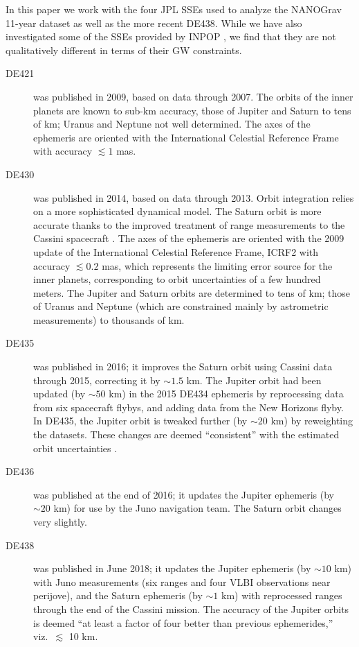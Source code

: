 \documentclass[iop,apj,twocolappendix]{emulateapj}
\begin{document}
In this paper we work with the four JPL SSEs used to analyze the NANOGrav 11-year dataset \citep{2018ApJ...859...47A} as well as the more recent DE438. While we have also investigated some of the SSEs provided by INPOP \citep{inpop13,inpop17}, we find that they are not qualitatively different in terms of their GW constraints.
%
\begin{description}
%
\item[DE421 \citep{2009IPNPR.178C...1F}] was published in 2009, based on data through 2007. The orbits of the inner planets are known to sub-km accuracy, those of Jupiter and Saturn to tens of km; Uranus and Neptune not well determined. The axes of the ephemeris are oriented with the International Celestial Reference Frame \citep{Ma_1998} with accuracy $\lesssim 1$ mas.
%
\item[DE430 \citep{2014IPNPR.196C...1F}] was published in 2014, based on data through 2013. Orbit integration relies on a more sophisticated dynamical model. The Saturn orbit is more accurate thanks to the improved treatment of range measurements to the Cassini spacecraft \citep{PhysRevD.89.102002}.
The axes of the ephemeris are oriented with the 2009 update of the International Celestial Reference Frame, ICRF2 \citep{2015AJ....150...58F} with accuracy $\lesssim 0.2$ mas, which represents the limiting error source for the inner planets, corresponding to orbit uncertainties of a few hundred meters. The Jupiter and Saturn orbits are determined to tens of km; those of Uranus and Neptune (which are constrained mainly by astrometric measurements) to thousands of km. 
%
\item[DE435 \citep{de435}] was published in 2016; it improves the Saturn orbit using Cassini data through 2015, correcting it by $\sim 1.5$ km. The Jupiter orbit had been updated (by $\sim 50$ km) in the 2015 DE434 ephemeris \citep{de434} by reprocessing data from six spacecraft flybys, and adding data from the New Horizons flyby. In DE435, the Jupiter orbit is tweaked further (by $\sim 20$ km) by reweighting the datasets. These changes are deemed ``consistent'' with the estimated orbit uncertainties \citep{de434,de435}.
%
\item[DE436 \citep{de436}] was published at the end of 2016; it updates the Jupiter ephemeris (by $\sim 20$ km) for use by the Juno navigation team. The Saturn orbit changes very slightly.
%
\item[DE438 \citep{de438}] was published in June 2018; it updates the Jupiter ephemeris (by $\sim 10$ km) with Juno measurements (six ranges and four VLBI observations near perijove), and the Saturn ephemeris (by $\sim 1$ km) with reprocessed ranges through the end of the Cassini mission. The accuracy of the Jupiter orbits is deemed ``at least a factor of four better than previous ephemerides,'' viz.\ $\lesssim$ 10 km.
%
\end{description}
\end{document}
